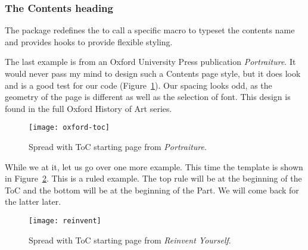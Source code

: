 \subsubsection{The Contents heading}
 
 The   package redefines the \cmd{\tableofcontents}  to call a specific macro to typeset
 the contents name and provides hooks to provide flexible styling. 
              
%

The last example is from an Oxford University Press publication \textit{Portraiture}. It would never pass my mind to design such a Contents page style, but it does look and is a good test for our code  (Figure~\ref{tocsample}). Our spacing looks odd, as the geometry of the page is different as well as the selection of font. This design is found in the full Oxford History of Art series.

\begin{figure}[htbp]
\centering
\texttt{[image: oxford-toc]}
\caption{Spread with ToC starting page from \textit{Portraiture}.}
\label{tocsample}
\end{figure}

While we at it, let us go over one more example. This time the template is shown in Figure~\ref{fig:reinvent}. This is a ruled example. The top rule will be at the beginning of the ToC and the bottom will be at the beginning of the Part. We will come back for the latter later.

\begin{figure}[htbp]
\centering
\texttt{[image: reinvent]}
\caption{Spread with ToC starting page from \textit{Reinvent Yourself}.}
\label{fig:reinvent}
\end{figure}

